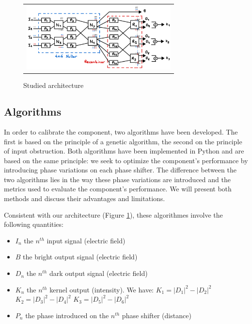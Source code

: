 \documentclass{aa}
\begin{document}
    \begin{figure}[H]
        \begin{center}
        \begin{tabular}{c}
        \includegraphics[height=3.5cm]{img/scheme.png}
        \end{tabular}
        \end{center}
        \caption[architecture] 
        { \label{fig:architecture} 
        Studied architecture}
    \end{figure}

    \subsection{Algorithms}

        In order to calibrate the component, two algorithms have been developed. The first is based on the principle of a genetic algorithm, the second on the principle of input obstruction. Both algorithms have been implemented in Python and are based on the same principle: we seek to optimize the component's performance by introducing phase variations on each phase shifter. The difference between the two algorithms lies in the way these phase variations are introduced and the metrics used to evaluate the component's performance. We will present both methods and discuss their advantages and limitations.

        Consistent with our architecture (Figure \ref{fig:architecture}), these algorithmes involve the following quantities:
        \begin{itemize}
            \item $I_n$ the $n^{th}$ input signal (electric field)
            \item $B$ the bright output signal (electric field)
            \item $D_n$ the $n^{th}$ dark output signal (electric field)
            \item $K_n$ the $n^{th}$ kernel output (intensity). We have:
            \subitem $K_1 = |D_1|^2 - |D_2|^2$
            \subitem $K_2 = |D_3|^2 - |D_4|^2$
            \subitem $K_3 = |D_5|^2 - |D_6|^2$
            \item $P_n$ the phase introduced on the $n^{th}$ phase shifter (distance)
        \end{itemize}
\end{document}
